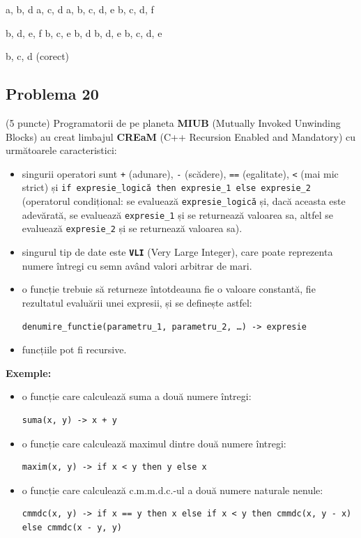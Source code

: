 \documentclass{exam}
\begin{document}
\begin{oneparchoices}
 \choice a, b, d
  \choice a, c, d
  \choice  a, b, c, d, e
   \choice  b, c, d, f

 \choice b, d, e, f
 \choice b, c, e
 \choice b, d
\choice b, d,  e  
\choice b, c, d,  e

\choice  b, c, d (corect) 
\end{oneparchoices}

\subsection*{Problema 20}

(5 puncte) Programatorii de pe planeta \textbf{MIUB} (Mutually Invoked Unwinding Blocks) au creat limbajul \textbf{CREaM} (C++ Recursion Enabled and Mandatory) cu următoarele caracteristici:

\begin{itemize}
  \item singurii operatori sunt \texttt{+} (adunare), \texttt{-} (scădere), \texttt{==} (egalitate), \texttt{<} (mai mic strict) și \texttt{if expresie\_logică then expresie\_1 else expresie\_2} (operatorul condițional: se evaluează \texttt{expresie\_logică} și, dacă aceasta este adevărată, se evaluează \texttt{expresie\_1} și se returnează valoarea sa, altfel se evaluează \texttt{expresie\_2} și se returnează valoarea sa).
  \item singurul tip de date este \texttt{\textbf{VLI}} (Very Large Integer), care poate reprezenta numere întregi cu semn având valori arbitrar de mari.
  \item o funcție trebuie să returneze întotdeauna fie o valoare constantă, fie rezultatul evaluării unei expresii, și se definește astfel:
  
    \centerline{\texttt{denumire\_functie(parametru\_1, parametru\_2, \ldots) -> expresie}}
  
  \item funcțiile pot fi recursive.
\end{itemize}

\noindent
\textbf{Exemple:}
\begin{itemize}
  \item o funcție care calculează suma a două numere întregi:
  \begin{lstlisting}
suma(x, y) -> x + y
  \end{lstlisting}
  
  \item o funcție care calculează maximul dintre două numere întregi:
  \begin{lstlisting}
maxim(x, y) -> if x < y then y else x
  \end{lstlisting}

  \item o funcție care calculează c.m.m.d.c.-ul a două numere naturale nenule:
  \begin{lstlisting}
cmmdc(x, y) -> if x == y then x else if x < y then cmmdc(x, y - x) else cmmdc(x - y, y)
  \end{lstlisting}
\end{itemize}
\end{document}
